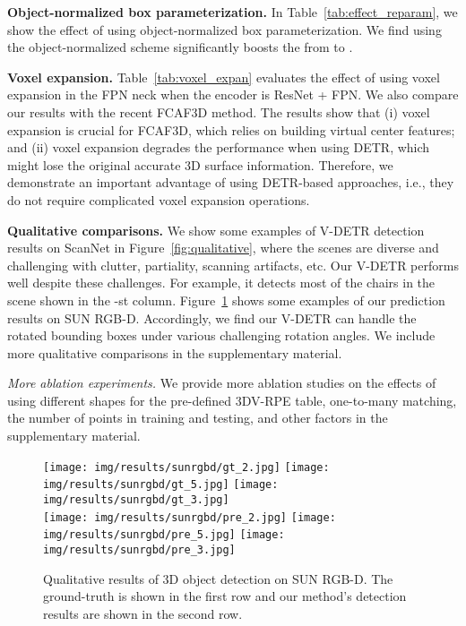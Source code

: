 \documentclass[10pt,twocolumn,letterpaper]{article}
\begin{document}
\vspace{1mm}
\noindent \textbf{Object-normalized box parameterization.}
In Table~\ref{tab:effect_reparam}, we show the effect of using object-normalized box parameterization.
We find using the object-normalized scheme significantly boosts the  from  to .

\vspace{1mm}
\noindent \textbf{Voxel expansion.}
Table~\ref{tab:voxel_expan} evaluates the effect of using voxel expansion in the FPN neck when the encoder is ResNet + FPN. We also compare our results with the recent FCAF3D method. The results show that (i) voxel expansion is crucial for FCAF3D, which relies on building virtual center features; and (ii) voxel expansion degrades the performance when using DETR, which might lose the original accurate 3D surface information. Therefore, we demonstrate an important advantage of using DETR-based approaches, i.e., they do not require complicated voxel expansion operations.

\vspace{1mm}
\noindent \textbf{Qualitative comparisons.} 
We show some examples of V-DETR detection results on ScanNet in Figure~\ref{fig:qualitative}, where the scenes are diverse and challenging with clutter, partiality, scanning artifacts, etc.
Our V-DETR performs well despite these challenges. For example, it detects most of the chairs in the scene shown in the -st column.
Figure~\ref{fig:qualitative_sunrgbd} shows some examples of our prediction results on SUN RGB-D. Accordingly, we find our V-DETR can handle the rotated bounding boxes under various challenging rotation angles.
We include more qualitative comparisons in the supplementary material.


\noindent \emph{More ablation experiments.} 
We provide more ablation studies on the effects of using different shapes for the pre-defined 3DV-RPE table, one-to-many matching, the number of points in training and testing, and other factors in the supplementary material.


\begin{figure}[t]
\centering
\texttt{[image: img/results/sunrgbd/gt\_2.jpg]}
\texttt{[image: img/results/sunrgbd/gt\_5.jpg]}
\texttt{[image: img/results/sunrgbd/gt\_3.jpg]}
\hfill \\
\texttt{[image: img/results/sunrgbd/pre\_2.jpg]}
\texttt{[image: img/results/sunrgbd/pre\_5.jpg]}
\texttt{[image: img/results/sunrgbd/pre\_3.jpg]}
\caption{\small{
Qualitative results of 3D object detection on SUN RGB-D. The ground-truth is shown in the first row and our method's detection results are shown in the second row.
}}
\label{fig:qualitative_sunrgbd}
\end{figure}
\end{document}
